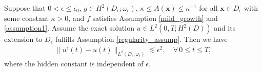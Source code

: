 \documentclass[10pt,a4paper]{amsart}
\begin{document}
\begin{theorem}
	\label{thm3}
	Suppose that $0<\epsilon\leq \epsilon_0$,  $g\in H^2(D_{\epsilon};\omega_{\epsilon})$, $\kappa\leq A(\bm x)\leq \kappa^{-1}$ for all $\bm x \in D_{\epsilon}$ with some constant $\kappa>0$, and $f$ satisfies  Assumption \ref{mild_growth} and \ref{assumption1}. Assume the exact solution $u\in L^2(0,T;H^2(D))$ and its extension  to $D_\epsilon$ fulfills Assumption  \ref{regularity_assump}. Then we have
	\begin{equation}
		\label{thm3-1}
		\begin{split}
			\|u^{\epsilon}(t)-u(t)\|_{L^2(D_{\epsilon};\omega_{\epsilon})}\lesssim \epsilon^2, \quad \forall \,0\leq t \leq T,
		\end{split}
	\end{equation}
	where the hidden constant is independent of $\epsilon$.
\end{theorem}
\end{document}
